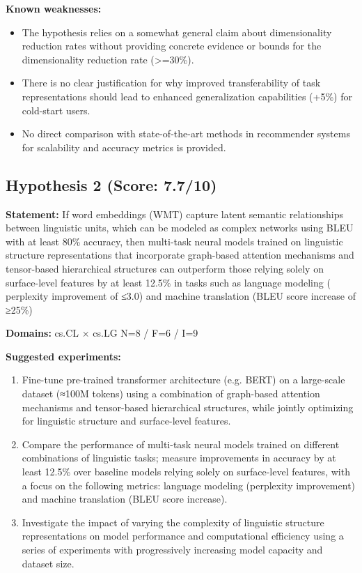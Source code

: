 \documentclass[12pt,a4paper]{article}
\begin{document}
\textbf{Known weaknesses:}
\begin{itemize}
  \item The hypothesis relies on a somewhat general claim about dimensionality reduction rates without providing concrete evidence or bounds for the dimensionality reduction rate (>=30\%).
  \item There is no clear justification for why improved transferability of task representations should lead to enhanced generalization capabilities (+5\%) for cold-start users.
  \item No direct comparison with state-of-the-art methods in recommender systems for scalability and accuracy metrics is provided.
\end{itemize}
\subsection*{Hypothesis 2 (Score: 7.7/10)}

\textbf{Statement:} If word embeddings (WMT) capture latent semantic relationships between linguistic units, which can be modeled as complex networks using BLEU with at least 80\% accuracy, then multi-task neural models trained on linguistic structure representations that incorporate graph-based attention mechanisms and tensor-based hierarchical structures can outperform those relying solely on surface-level features by at least 12.5\% in tasks such as language modeling ( perplexity improvement of ≤3.0) and machine translation (BLEU score increase of ≥25\%)

\noindent\textbf{Domains:} cs.CL $\times$ cs.LG
\hspace{1em} N=8 / F=6 / I=9

\textbf{Suggested experiments:}
\begin{enumerate}
  \item Fine-tune pre-trained transformer architecture (e.g. BERT) on a large-scale dataset (≈100M tokens) using a combination of graph-based attention mechanisms and tensor-based hierarchical structures, while jointly optimizing for linguistic structure and surface-level features.
  \item Compare the performance of multi-task neural models trained on different combinations of linguistic tasks; measure improvements in accuracy by at least 12.5\% over baseline models relying solely on surface-level features, with a focus on the following metrics: language modeling (perplexity improvement) and machine translation (BLEU score increase).
  \item Investigate the impact of varying the complexity of linguistic structure representations on model performance and computational efficiency using a series of experiments with progressively increasing model capacity and dataset size.
\end{enumerate}
\end{document}
